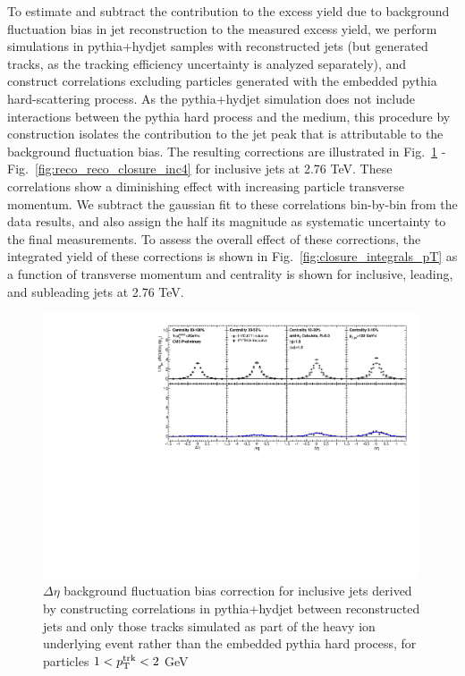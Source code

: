 To estimate and subtract the contribution to the excess yield due to background fluctuation bias in jet reconstruction  to the measured excess yield, we perform simulations in {\sc pythia+hydjet} samples with reconstructed jets (but generated tracks, as the tracking efficiency uncertainty is analyzed separately), and construct correlations excluding particles generated with the embedded {\sc pythia} hard-scattering process.  As the {\sc pythia+hydjet} simulation does not include interactions between the {\sc pythia} hard process and the medium, this procedure by construction isolates the contribution to the jet peak that is attributable to the background fluctuation bias. The resulting corrections are illustrated in Fig.~\ref{fig:reco_reco_closure_deta_inc} -  Fig.~\ref{fig:reco_reco_closure_inc4} for inclusive jets at 2.76 TeV.  These correlations show a diminishing effect with increasing particle transverse momentum.  We subtract the gaussian fit to these correlations bin-by-bin from the data results, and also assign the half its magnitude as systematic uncertainty to the final measurements.  To assess the overall effect of these corrections, the integrated yield of these corrections is shown in Fig.~\ref{fig:closure_integrals_pT} as a function of transverse momentum and centrality is shown for inclusive, leading, and subleading jets at 2.76 TeV. 


      \begin{figure}[hbtp]
      \begin{center}\includegraphics[width=0.99\textwidth]{figures/JFF_SpillOver/AN_Closures_Eta_InclusiveTrkPt1_TrkPt2.pdf}
      \caption[Background fluctuation bias corrections for particles with $1<p_{\rm T}^{\rm trk}<2$ GeV]{$\Delta\eta$ background fluctuation bias correction for inclusive jets derived by constructing correlations in {\sc pythia+hydjet} between reconstructed jets and only those tracks simulated as part of the heavy ion underlying event rather than the embedded {\sc pythia} hard process, for particles $1<p_{\rm T}^{\rm trk}<2$ GeV}
        \label{fig:reco_reco_closure_deta_inc}
        \end{center}
        \end{figure}



